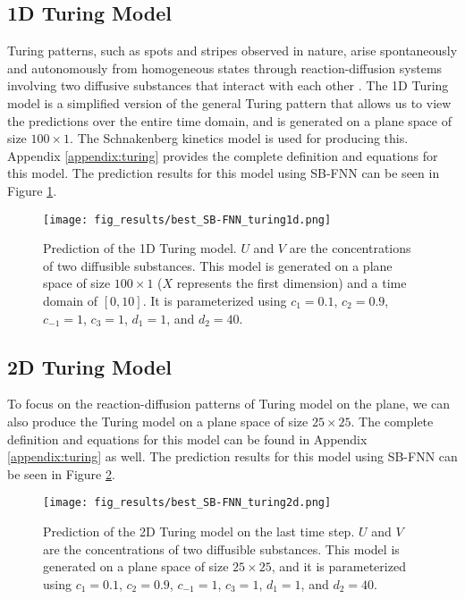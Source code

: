 \subsection{1D Turing Model}
Turing patterns, such as spots and stripes observed in nature, arise spontaneously and autonomously from homogeneous states through reaction-diffusion systems involving two diffusive substances that interact with each other \cite{turing1990chemical}. The 1D Turing model is a simplified version of the general Turing pattern that allows us to view the predictions over the entire time domain, and is generated on a plane space of size $100\times 1$. The Schnakenberg kinetics model \cite{maini2012turing} is used for producing this. Appendix \ref{appendix:turing} provides the complete definition and equations for this model. The prediction results for this model using SB-FNN can be seen in Figure \ref{fig:turing1d_prediction}.

\begin{figure}[h]
\centering
\texttt{[image: fig\_results/best\_SB-FNN\_turing1d.png]}
\caption[Prediction of the 1D Turing model] {Prediction of the 1D Turing model. $U$ and $V$ are the concentrations of two diffusible substances. This model is generated on a plane space of size $100\times 1$ ($X$ represents the first dimension) and a time domain of $[0,10]$. It is parameterized using $c_1 = 0.1$, $c_2=0.9$, $c_{-1}=1$, $c_3=1$, $d_1=1$, and $d_2=40$.}
\label{fig:turing1d_prediction}
\end{figure}

\subsection{2D Turing Model}
To focus on the reaction-diffusion patterns of Turing model on the plane, we can also produce the Turing model on a plane space of size $25\times 25$. The complete definition and equations for this model can be found in Appendix \ref{appendix:turing} as well. The prediction results for this model using SB-FNN can be seen in Figure \ref{fig:turing2d_prediction}.

\begin{figure}[h]
\centering
\texttt{[image: fig\_results/best\_SB-FNN\_turing2d.png]}
\caption[Prediction of the 2D Turing model] {Prediction of the 2D Turing model on the last time step. $U$ and $V$ are the concentrations of two diffusible substances. This model is generated on a plane space of size $25\times 25$, and it is parameterized using $c_1 = 0.1$, $c_2=0.9$, $c_{-1}=1$, $c_3=1$, $d_1=1$, and $d_2=40$.}
\label{fig:turing2d_prediction}
\end{figure}


